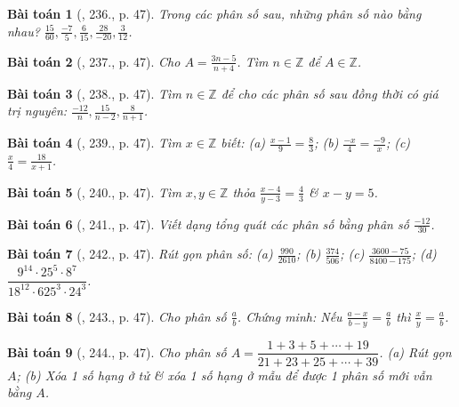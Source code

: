 \documentclass{article}
\newtheorem{baitoan}{Bài toán}
\begin{document}
\begin{baitoan}[\cite{Tuyen_Toan_6}, 236., p. 47]
	Trong các phân số sau, những phân số nào bằng nhau? $\frac{15}{60},\frac{-7}{5},\frac{6}{15},\frac{28}{-20},\frac{3}{12}$.
\end{baitoan}

\begin{baitoan}[\cite{Tuyen_Toan_6}, 237., p. 47]
	Cho $A = \frac{3n - 5}{n + 4}$. Tìm $n\in\mathbb{Z}$ để $A\in\mathbb{Z}$.
\end{baitoan}

\begin{baitoan}[\cite{Tuyen_Toan_6}, 238., p. 47]
	Tìm $n\in\mathbb{Z}$ để cho các phân số sau đồng thời có giá trị nguyên: $\frac{-12}{n},\frac{15}{n - 2},\frac{8}{n + 1}$.
\end{baitoan}

\begin{baitoan}[\cite{Tuyen_Toan_6}, 239., p. 47]
	Tìm $x\in\mathbb{Z}$ biết: (a) $\frac{x - 1}{9} = \frac{8}{3}$; (b) $\frac{-x}{4} = \frac{-9}{x}$; (c) $\frac{x}{4} = \frac{18}{x + 1}$.
\end{baitoan}

\begin{baitoan}[\cite{Tuyen_Toan_6}, 240., p. 47]
	Tìm $x,y\in\mathbb{Z}$ thỏa $\frac{x - 4}{y - 3} = \frac{4}{3}$ \& $x - y = 5$.
\end{baitoan}

\begin{baitoan}[\cite{Tuyen_Toan_6}, 241., p. 47]
	Viết dạng tổng quát các phân số bằng phân số $\frac{-12}{30}$.
\end{baitoan}

\begin{baitoan}[\cite{Tuyen_Toan_6}, 242., p. 47]
	Rút gọn phân số: (a) $\frac{990}{2610}$; (b) $\frac{374}{506}$; (c) $\frac{3600 - 75}{8400 - 175}$; (d) $\dfrac{9^{14}\cdot25^5\cdot8^7}{18^{12}\cdot625^3\cdot24^3}$.
\end{baitoan}

\begin{baitoan}[\cite{Tuyen_Toan_6}, 243., p. 47]
	Cho phân số $\frac{a}{b}$. Chứng minh: Nếu $\frac{a - x}{b - y} = \frac{a}{b}$ thì $\frac{x}{y} = \frac{a}{b}$.
\end{baitoan}

\begin{baitoan}[\cite{Tuyen_Toan_6}, 244., p. 47]
	Cho phân số $A = \dfrac{1 + 3 + 5 + \cdots + 19}{21 + 23 + 25 + \cdots + 39}$. (a) Rút gọn $A$; (b) Xóa 1 số hạng ở tử \& xóa 1 số hạng ở mẫu để được 1 phân số mới vẫn bằng $A$.
\end{baitoan}
\end{document}

